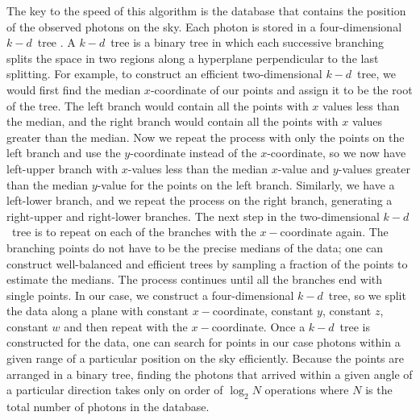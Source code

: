 \documentclass[useAMS,usenatbib]{mn2e}
\begin{document}
The key to the speed of this algorithm is the database that contains
the position of the observed photons on the sky.  Each photon is
stored in a four-dimensional $k-d$~tree
\citep{Bentley:1975:MBS:361002.361007}.  A $k-d$~tree is a binary tree
in which each successive branching splits the space in two regions
along a hyperplane perpendicular to the last splitting.  For example,
to construct an efficient two-dimensional $k-d$~tree, we would first
find the median $x$-coordinate of our points and assign it to be the
root of the tree.  The left branch would contain all the points with
$x$ values less than the median, and the right branch would contain
all the points with $x$ values greater than the median.  Now we repeat
the process with only the points on the left branch and use the
$y$-coordinate instead of the $x$-coordinate, so we now have
left-upper branch with $x$-values less than the median $x$-value and
$y$-values greater than the median $y$-value for the points on the
left branch.  Similarly, we have a left-lower branch, and we repeat the
process on the right branch, generating a right-upper and right-lower
branches.  The next step in the two-dimensional $k-d$~tree is to
repeat on each of the branches with the $x-$coordinate again.
The branching points do not have to be the precise medians
of the data; one can construct well-balanced and efficient trees by
sampling a fraction of the points to estimate the medians.
The process continues until all the branches end with single points.
In our case, we construct a four-dimensional $k-d$~tree, so we split
the data along a plane with constant $x-$coordinate, constant $y$,
constant $z$, constant $w$ and then repeat with the $x-$coordinate.
Once a $k-d$~tree is constructed for the data, one can search for
points in our case photons within a given range of a particular
position on the sky efficiently.  Because the points are arranged in a
binary tree, finding the photons that arrived within a given angle
of a particular direction takes only on order of $\log_2 N$ operations
where $N$ is the total number of photons in the database.
\end{document}
